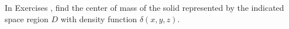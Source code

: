 {\noindent In Exercises} 
{,  find the center of mass of the solid represented by the indicated space region $D$ with density function $\delta(x,y,z)$.
}

